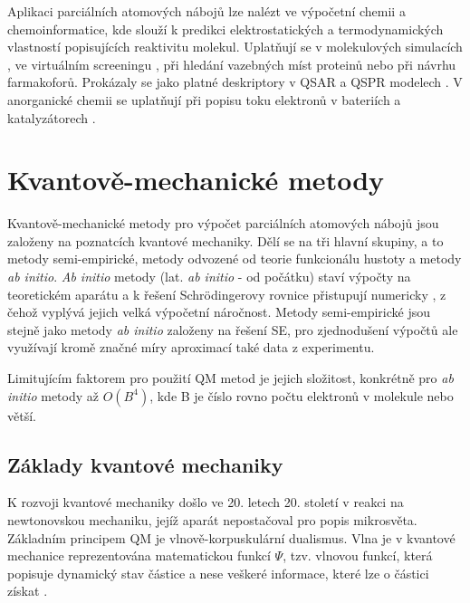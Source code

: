 Aplikaci parciálních atomových nábojů lze nalézt ve výpočetní chemii a chemoinformatice, kde slouží k predikci elektrostatických a termodynamických vlastností popisujících reaktivitu molekul. Uplatňují se v molekulových simulacích \cite{molsimul}, ve virtuálním screeningu \cite{virtscreen}, při hledání vazebných míst proteinů nebo při návrhu farmakoforů. Prokázaly se jako platné deskriptory v QSAR a QSPR modelech \cite{Ghaf:QSAR, Karel:QSAR+QSPR}. V anorganické chemii se uplatňují při popisu toku elektronů v bateriích a katalyzátorech \cite{innorg}. 


\section{Kvantově-mechanické metody}
Kvantově-mechanické metody pro výpočet parciálních atomových nábojů jsou založeny na poznatcích kvantové mechaniky. Dělí se na tři hlavní skupiny, a to metody semi-empirické, metody odvozené od teorie funkcionálu hustoty a metody \textit{ab initio}. \textit{Ab initio} metody (lat. \textit{ab initio} - od počátku) staví výpočty na teoretickém aparátu a k řešení Schrödingerovy rovnice přistupují numericky%
, z čehož vyplývá jejich velká výpočetní náročnost. Metody semi-empirické jsou stejně jako metody \textit{ab initio} založeny na řešení SE, pro zjednodušení výpočtů ale využívají kromě značné míry aproximací také data z experimentu. 

Limitujícím faktorem pro použití QM metod je jejich složitost, konkrétně pro \textit{ab initio} metody až $O(B^4)$, kde B je číslo rovno počtu elektronů v molekule nebo větší. 

\subsection{Základy kvantové mechaniky}
K rozvoji kvantové mechaniky došlo ve 20. letech 20. století v reakci na newtonovskou mechaniku, jejíž aparát nepostačoval pro popis mikrosvěta.  
Základním principem QM je vlnově-korpuskulární dualismus. %
Vlna je v kvantové mechanice reprezentována matematickou funkcí $\Psi$, tzv. vlnovou funkcí, která popisuje dynamický stav částice a nese veškeré informace, které lze o částici získat \cite{Cely}. %

